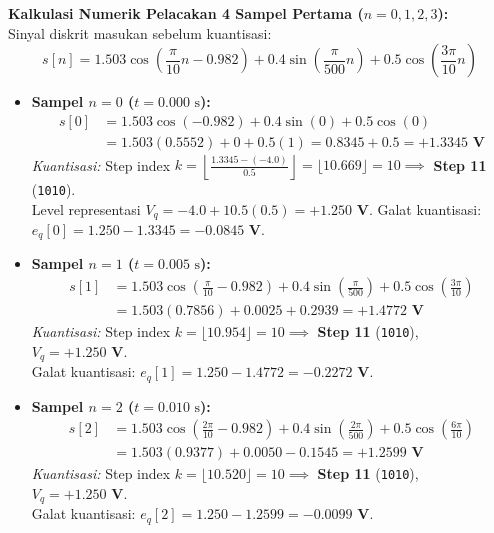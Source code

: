 \documentclass[11pt,a4paper]{article}
\begin{document}
\vspace{0.2cm}
\textbf{Kalkulasi Numerik Pelacakan 4 Sampel Pertama ($n=0, 1, 2, 3$):}\\
Sinyal diskrit masukan sebelum kuantisasi:
\begin{equation}
s[n] = 1.503 \cos\left(\frac{\pi}{10}n - 0.982\right) + 0.4 \sin\left(\frac{\pi}{500}n\right) + 0.5 \cos\left(\frac{3\pi}{10}n\right)
\end{equation}
\begin{itemize}[leftmargin=*]
  \item \textbf{Sampel $n=0$ ($t = 0.000\text{ s}$):}
  \begin{align*}
  s[0] &= 1.503 \cos(-0.982) + 0.4 \sin(0) + 0.5 \cos(0) \\
  &= 1.503(0.5552) + 0 + 0.5(1) = 0.8345 + 0.5 = \mathbf{+1.3345\text{ V}}
  \end{align*}
  \textit{Kuantisasi:} Step index $k = \left\lfloor \frac{1.3345 - (-4.0)}{0.5} \right\rfloor = \lfloor 10.669 \rfloor = 10 \implies$ \textbf{Step 11} (\texttt{1010}).\\
  Level representasi $V_q = -4.0 + 10.5(0.5) = \mathbf{+1.250\text{ V}}$. Galat kuantisasi: $e_q[0] = 1.250 - 1.3345 = \mathbf{-0.0845\text{ V}}$.

  \item \textbf{Sampel $n=1$ ($t = 0.005\text{ s}$):}
  \begin{align*}
  s[1] &= 1.503 \cos\left(\frac{\pi}{10} - 0.982\right) + 0.4 \sin\left(\frac{\pi}{500}\right) + 0.5 \cos\left(\frac{3\pi}{10}\right) \\
  &= 1.503(0.7856) + 0.0025 + 0.2939 = \mathbf{+1.4772\text{ V}}
  \end{align*}
  \textit{Kuantisasi:} Step index $k = \lfloor 10.954 \rfloor = 10 \implies$ \textbf{Step 11} (\texttt{1010}), $V_q = \mathbf{+1.250\text{ V}}$.\\
  Galat kuantisasi: $e_q[1] = 1.250 - 1.4772 = \mathbf{-0.2272\text{ V}}$.

  \item \textbf{Sampel $n=2$ ($t = 0.010\text{ s}$):}
  \begin{align*}
  s[2] &= 1.503 \cos\left(\frac{2\pi}{10} - 0.982\right) + 0.4 \sin\left(\frac{2\pi}{500}\right) + 0.5 \cos\left(\frac{6\pi}{10}\right) \\
  &= 1.503(0.9377) + 0.0050 - 0.1545 = \mathbf{+1.2599\text{ V}}
  \end{align*}
  \textit{Kuantisasi:} Step index $k = \lfloor 10.520 \rfloor = 10 \implies$ \textbf{Step 11} (\texttt{1010}), $V_q = \mathbf{+1.250\text{ V}}$.\\
  Galat kuantisasi: $e_q[2] = 1.250 - 1.2599 = \mathbf{-0.0099\text{ V}}$.


\end{itemize}
\end{document}
